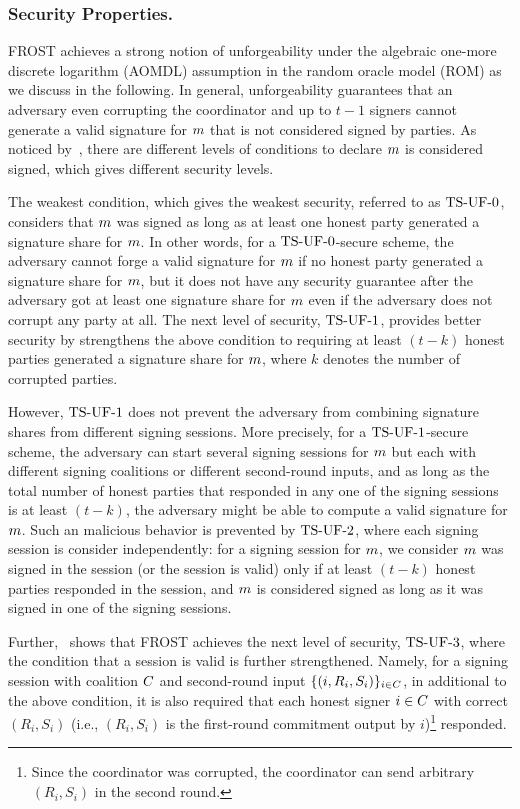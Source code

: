 \subsubsection{Security Properties.}
FROST achieves a strong notion of unforgeability under the algebraic one-more discrete logarithm (AOMDL) assumption in the random oracle model (ROM) as we discuss in the following.
In general, unforgeability guarantees that an adversary even corrupting the coordinator and up to $t-1$ signers cannot generate a valid signature for $m$ that is not considered signed by parties. As noticed by~\cite{BellareCKMTZ22}, there are different levels of conditions to declare $m$ is considered signed, which gives different security levels.

The weakest condition, which gives the weakest security, referred to as $\mathrm{TS}\mbox{-}\mathrm{UF}\mbox{-}{0}$, considers that $m$ was signed as long as at least one honest party generated a signature share for $m$. In other words, for a $\mathrm{TS}\mbox{-}\mathrm{UF}\mbox{-}{0}$-secure scheme, the adversary cannot forge a valid signature for $m$ if no honest party generated a signature share for $m$, but it does not have any security guarantee after the adversary got at least one signature share for $m$ even if the adversary does not corrupt any party at all.
The next level of security, $\mathrm{TS}\mbox{-}\mathrm{UF}\mbox{-}{1}$, provides better security by strengthens the above condition to requiring at least $(t - k)$ honest parties generated a signature share for $m$, where $k$ denotes the number of corrupted parties.

However, $\mathrm{TS}\mbox{-}\mathrm{UF}\mbox{-}{1}$ does not prevent the adversary from combining signature shares from different signing sessions. More precisely, for a $\mathrm{TS}\mbox{-}\mathrm{UF}\mbox{-}{1}$-secure scheme, the adversary can start several signing sessions for $m$ but each with different signing coalitions or different second-round inputs, and as long as the total number of honest parties that responded in any one of the signing sessions is at least $(t-k)$, the adversary might be able to compute a valid signature for $m$. Such an malicious behavior is prevented by $\mathrm{TS}\mbox{-}\mathrm{UF}\mbox{-}{2}$, where each signing session is consider independently: for a signing session for $m$, we consider $m$ was signed in the session (or the session is valid) only if at least $(t - k)$ honest parties responded in the session, and $m$ is considered signed as long as it was signed in one of the signing sessions.

Further,~\cite{BellareCKMTZ22} shows that FROST achieves the next level of security, $\mathrm{TS}\mbox{-}\mathrm{UF}\mbox{-}{3}$, where the condition that a session is valid is further strengthened. Namely, for a signing session with coalition $C$ and second-round input $\{ (i, R_i, S_i)\}_{i \in C}$, in additional to the above condition, it is also required that each honest signer $i\in C$ with correct $(R_i, S_i)$ (i.e., $(R_i, S_i)$ is the first-round commitment output by $i$)\footnote{Since the coordinator was corrupted, the coordinator can send arbitrary $(R_i, S_i)$ in the second round.} responded.

